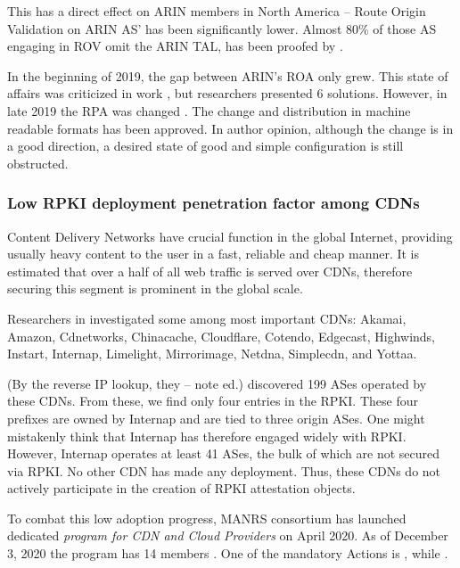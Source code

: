 This has a direct effect on ARIN members in North America -- Route Origin Validation on ARIN AS' has been significantly lower. Almost 80\% of those AS engaging in ROV omit the ARIN TAL, has been proofed by \cite{CartwrightCox2018}.

In the beginning of 2019, the gap between ARIN's ROA only grew. This state of affairs was criticized in work \cite{Yoo2019}, but researchers presented 6 solutions.
However, in late 2019 the RPA was changed \cite{Curran2019}.
The change  and distribution in machine readable formats has been approved. In author opinion, although the change is in a good direction, a desired state of good and simple configuration is still obstructed.


\subsubsection{Low RPKI deployment penetration factor among CDNs}
Content Delivery Networks have crucial function in the global Internet, providing usually heavy content to the user in a fast, reliable and cheap manner. It is estimated that over a half of all web traffic is served over CDNs, therefore securing this segment is prominent in the global scale.

Researchers in \cite{Waehlisch2014} investigated some among most important CDNs: Akamai, Amazon, Cdnetworks, Chinacache, Cloudflare, Cotendo, Edgecast, Highwinds, Instart, Internap, Limelight, Mirrorimage, Netdna, Simplecdn, and Yottaa.

\begin{displayquote}
(By the reverse IP lookup, they -- note ed.) discovered 199 ASes operated by these CDNs. From these, we find only four entries in the RPKI. These four prefixes are owned by Internap and are tied to three origin ASes.  One might mistakenly think that Internap has therefore engaged widely with RPKI. However, Internap operates at least 41 ASes, the bulk of which are not secured via RPKI. No other CDN has made any deployment. Thus, these CDNs do not actively participate in the creation of RPKI attestation objects.
\end{displayquote}

To combat this low adoption progress, {MANRS} consortium has launched dedicated \emph{program for CDN and Cloud Providers} on April 2020. As of December 3, 2020 the program has 14 members \cite{Siddiqui2020}. One of the mandatory Actions is , while .


